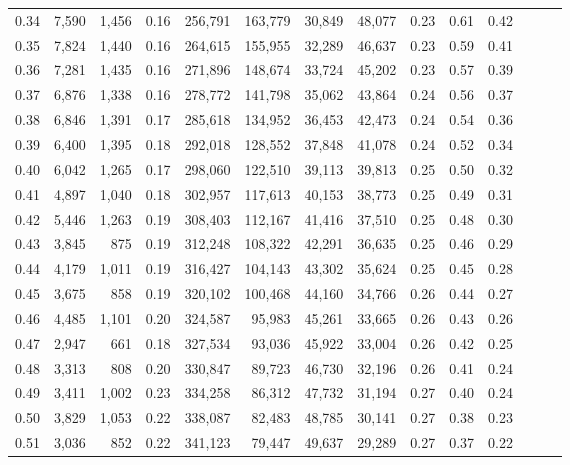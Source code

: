\begin{tabular}{rrrrrrrrrrrrrr}
0.34 &   7,590 &  1,456 &  0.16 &  256,791 &  163,779 &  30,849 &  48,077 &  0.23 &  0.61 &      0.42 \\
0.35 &   7,824 &  1,440 &  0.16 &  264,615 &  155,955 &  32,289 &  46,637 &  0.23 &  0.59 &      0.41 \\
0.36 &   7,281 &  1,435 &  0.16 &  271,896 &  148,674 &  33,724 &  45,202 &  0.23 &  0.57 &      0.39 \\
0.37 &   6,876 &  1,338 &  0.16 &  278,772 &  141,798 &  35,062 &  43,864 &  0.24 &  0.56 &      0.37 \\
0.38 &   6,846 &  1,391 &  0.17 &  285,618 &  134,952 &  36,453 &  42,473 &  0.24 &  0.54 &      0.36 \\
0.39 &   6,400 &  1,395 &  0.18 &  292,018 &  128,552 &  37,848 &  41,078 &  0.24 &  0.52 &      0.34 \\
0.40 &   6,042 &  1,265 &  0.17 &  298,060 &  122,510 &  39,113 &  39,813 &  0.25 &  0.50 &      0.32 \\
0.41 &   4,897 &  1,040 &  0.18 &  302,957 &  117,613 &  40,153 &  38,773 &  0.25 &  0.49 &      0.31 \\
0.42 &   5,446 &  1,263 &  0.19 &  308,403 &  112,167 &  41,416 &  37,510 &  0.25 &  0.48 &      0.30 \\
0.43 &   3,845 &    875 &  0.19 &  312,248 &  108,322 &  42,291 &  36,635 &  0.25 &  0.46 &      0.29 \\
0.44 &   4,179 &  1,011 &  0.19 &  316,427 &  104,143 &  43,302 &  35,624 &  0.25 &  0.45 &      0.28 \\
0.45 &   3,675 &    858 &  0.19 &  320,102 &  100,468 &  44,160 &  34,766 &  0.26 &  0.44 &      0.27 \\
0.46 &   4,485 &  1,101 &  0.20 &  324,587 &   95,983 &  45,261 &  33,665 &  0.26 &  0.43 &      0.26 \\
0.47 &   2,947 &    661 &  0.18 &  327,534 &   93,036 &  45,922 &  33,004 &  0.26 &  0.42 &      0.25 \\
0.48 &   3,313 &    808 &  0.20 &  330,847 &   89,723 &  46,730 &  32,196 &  0.26 &  0.41 &      0.24 \\
0.49 &   3,411 &  1,002 &  0.23 &  334,258 &   86,312 &  47,732 &  31,194 &  0.27 &  0.40 &      0.24 \\
0.50 &   3,829 &  1,053 &  0.22 &  338,087 &   82,483 &  48,785 &  30,141 &  0.27 &  0.38 &      0.23 \\
0.51 &   3,036 &    852 &  0.22 &  341,123 &   79,447 &  49,637 &  29,289 &  0.27 &  0.37 &      0.22 \\

\end{tabular}
